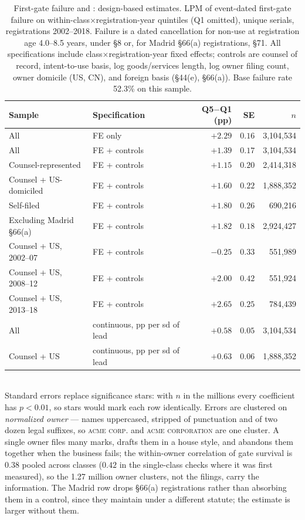 \begin{table}[h]\centering\small
\caption{First-gate failure and \dkl{}: design-based estimates.
LPM of event-dated first-gate failure on within-class$\times$registration-year
\dkl{} quintiles (Q1 omitted), unique serials, registrations 2002--2018.
Failure is a dated cancellation for non-use at registration age 4.0--8.5
years, under \S8 or, for Madrid \S66(a) registrations, \S71.
All specifications include class$\times$registration-year fixed effects; controls
are counsel of record, intent-to-use basis, log goods/services length,
log owner filing count, owner domicile (US, CN), and foreign basis
(\S44(e), \S66(a)). Base failure rate 52.3\% on this sample.}
\label{tab:gate_lpm}
\begin{tabular}{llrrr}
\toprule
Sample & Specification & Q5$-$Q1 (pp) & SE & $n$ \\
\midrule
All & FE only & $+2.29$ & $0.16$ & 3{,}104{,}534 \\
All & FE + controls & $+1.39$ & $0.17$ & 3{,}104{,}534 \\
Counsel-represented & FE + controls & $+1.15$ & $0.20$ & 2{,}414{,}318 \\
Counsel + US-domiciled & FE + controls & $+1.60$ & $0.22$ & 1{,}888{,}352 \\
Self-filed & FE + controls & $+1.80$ & $0.26$ & 690{,}216 \\
Excluding Madrid \S66(a) & FE + controls & $+1.82$ & $0.18$ & 2{,}924{,}427 \\
\midrule
Counsel + US, 2002--07 & FE + controls & $-0.25$ & $0.33$ & 551{,}989 \\
Counsel + US, 2008--12 & FE + controls & $+2.00$ & $0.42$ & 551{,}924 \\
Counsel + US, 2013--18 & FE + controls & $+2.65$ & $0.25$ & 784{,}439 \\
\midrule
All & continuous, pp per sd of lead & $+0.58$ & $0.05$ & 3{,}104{,}534 \\
Counsel + US & continuous, pp per sd of lead & $+0.63$ & $0.06$ & 1{,}888{,}352 \\
\bottomrule
\end{tabular}
\\[0.3em]\footnotesize Standard errors replace significance stars: with $n$
in the millions every coefficient has $p < 0.01$, so stars would mark each
row identically. Errors are clustered on \emph{normalized owner} --- names
uppercased, stripped of punctuation and of two dozen legal suffixes, so
\textsc{acme corp.} and \textsc{acme corporation} are one cluster. A single
owner files many marks, drafts them in a house style, and abandons them
together when the business fails; the within-owner correlation of gate
survival is $0.38$ pooled across classes ($0.42$ in the single-class checks
where it was first measured), so the 1.27 million owner clusters, not the filings,
carry the information. The Madrid row drops \S66(a) registrations rather
than absorbing them in a control, since they maintain under a different
statute; the estimate is larger without them.
\end{table}

